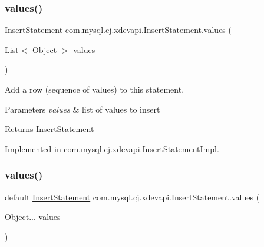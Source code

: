 \subsubsection{\texorpdfstring{values()}{values()}\hspace{0.1cm}{\footnotesize\ttfamily [1/2]}}
{\footnotesize\ttfamily \mbox{\hyperlink{interfacecom_1_1mysql_1_1cj_1_1xdevapi_1_1_insert_statement}{Insert\+Statement}} com.\+mysql.\+cj.\+xdevapi.\+Insert\+Statement.\+values (\begin{DoxyParamCaption}\item[{List$<$ Object $>$}]{values }\end{DoxyParamCaption})}

Add a row (sequence of values) to this statement.


\begin{DoxyParams}{Parameters}
{\em values} & list of values to insert \\
\hline
\end{DoxyParams}
\begin{DoxyReturn}{Returns}
\mbox{\hyperlink{interfacecom_1_1mysql_1_1cj_1_1xdevapi_1_1_insert_statement}{Insert\+Statement}} 
\end{DoxyReturn}


Implemented in \mbox{\hyperlink{classcom_1_1mysql_1_1cj_1_1xdevapi_1_1_insert_statement_impl_a22848b1b53273551d2c4ce65e2c237de}{com.\+mysql.\+cj.\+xdevapi.\+Insert\+Statement\+Impl}}.

\mbox{\label{interfacecom_1_1mysql_1_1cj_1_1xdevapi_1_1_insert_statement_a278914c27d67c2a8a5d71043eaeaae40}} 
\subsubsection{\texorpdfstring{values()}{values()}\hspace{0.1cm}{\footnotesize\ttfamily [2/2]}}
{\footnotesize\ttfamily default \mbox{\hyperlink{interfacecom_1_1mysql_1_1cj_1_1xdevapi_1_1_insert_statement}{Insert\+Statement}} com.\+mysql.\+cj.\+xdevapi.\+Insert\+Statement.\+values (\begin{DoxyParamCaption}\item[{Object...}]{values }\end{DoxyParamCaption})}

